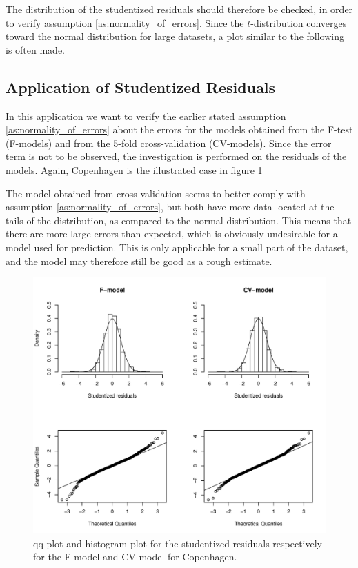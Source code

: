 The distribution of the studentized residuals should therefore be checked, in order to verify assumption \ref{as:normality_of_errors}. 
Since the $t$-distribution converges toward the normal distribution for large datasets, a plot similar to the following is often made.

\subsection{Application of Studentized Residuals}

In this application we want to verify the earlier stated assumption \ref{as:normality_of_errors} about the errors for the models obtained from the F-test (F-models) and from the 5-fold cross-validation (CV-models). 
Since the error term is not to be observed, the investigation is performed on the residuals of the models.
Again, Copenhagen is the illustrated case in figure \ref{fig:studentized_res_plot}

The model obtained from cross-validation seems to better comply with assumption \ref{as:normality_of_errors}, but both have more data located at the tails of the distribution, as compared to the normal distribution. 
This means that there are more large errors than expected, which is obviously undesirable for a model used for prediction.
This is only applicable for a small part of the dataset, and the model may therefore still be good as a rough estimate. 

    \begin{figure}[H]
        \centering
      \includegraphics[width = 1 \textwidth]{figures/Nanna/studentized_res_plot.pdf}
      \caption{qq-plot and histogram plot for the studentized residuals respectively for the F-model and CV-model for Copenhagen.}
      \label{fig:studentized_res_plot}
    \end{figure}


